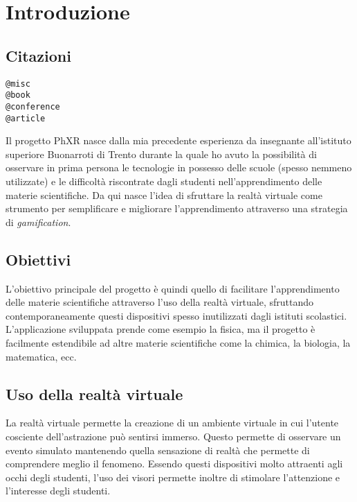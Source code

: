 \chapter{Introduzione}
\label{cha:introduzione}

\section{Citazioni}
\label{cha:examples_citations}

\texttt{@misc}\cite{misc} \\ %
\texttt{@book}\cite{book} \\ %
\texttt{@conference}\cite{conference} \\ %
\texttt{@article}\cite{article}

Il progetto PhXR nasce dalla mia precedente esperienza da insegnante all'istituto
superiore Buonarroti di Trento durante la quale ho avuto la possibilità di osservare
in prima persona le tecnologie in possesso delle scuole (spesso nemmeno
utilizzate) e le difficoltà riscontrate dagli studenti nell'apprendimento delle materie
scientifiche. Da qui nasce l'idea di sfruttare la realtà virtuale come strumento
per semplificare e migliorare l'apprendimento attraverso una strategia di
\textit{gamification}.

\section{Obiettivi}
\label{sec:introduzione_obiettivi}

L'obiettivo principale del progetto è quindi quello di facilitare l'apprendimento
delle materie scientifiche attraverso l'uso della realtà virtuale, sfruttando contemporaneamente
questi dispositivi spesso inutilizzati dagli istituti scolastici. L'applicazione
sviluppata prende come esempio la fisica, ma il progetto è facilmente estendibile
ad altre materie scientifiche come la chimica, la biologia, la matematica, ecc.


\section{Uso della realtà virtuale}
\label{sec:introduzione_uso_realtà_virtuale}

La realtà virtuale permette la creazione di un ambiente virtuale in cui l'utente
cosciente dell'astrazione può sentirsi immerso. Questo permette di osservare un evento
simulato mantenendo quella sensazione di realtà che permette di comprendere meglio
il fenomeno. Essendo questi dispositivi molto attraenti agli occhi degli
studenti, l'uso dei visori permette inoltre di stimolare l'attenzione e l'interesse
degli studenti.


